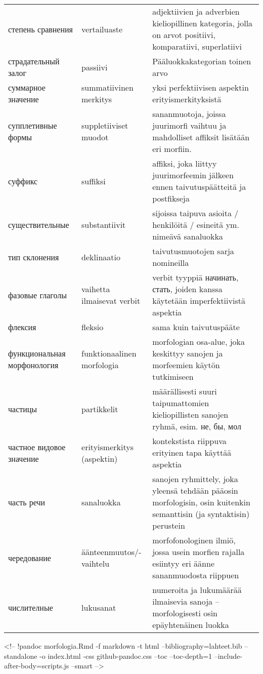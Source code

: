 \begin{longtable}[c]{@{}lll@{}}
степень сравнения & vertailuaste & adjektiivien ja adverbien
kieliopillinen kategoria, jolla on arvot positiivi, komparatiivi,
superlatiivi\tabularnewline
страдательный залог & passiivi & Pääluokkakategorian toinen
arvo\tabularnewline
суммарное значение & summatiivinen merkitys & yksi perfektiivisen
aspektin erityismerkityksistä\tabularnewline
супплетивные формы & suppletiiviset muodot & sananmuotoja, joissa
juurimorfi vaihtuu ja mahdolliset affiksit lisätään eri
morfiin.\tabularnewline
суффикс & suffiksi & affiksi, joka liittyy juurimorfeemin jälkeen ennen
taivutuspäätteitä ja postfikseja\tabularnewline
существительные & substantiivit & sijoissa taipuva asioita / henkilöitä
/ esineitä ym. nimeävä sanaluokka\tabularnewline
тип склонения & deklinaatio & taivutusmuotojen sarja
nomineilla\tabularnewline
фазовые глаголы & vaihetta ilmaisevat verbit & verbit tyyppiä начинать,
стать, joiden kanssa käytetään imperfektiivistä aspektia\tabularnewline
флексия & fleksio & sama kuin taivutuspääte\tabularnewline
функциональная морфонология & funktionaalinen morfologia & morfologian
osa-alue, joka keskittyy sanojen ja morfeemien käytön
tutkimiseen\tabularnewline
частицы & partikkelit & määrällisesti suuri taipumattomien
kieliopillisten sanojen ryhmä, esim. не, бы, мол\tabularnewline
частное видовое значение & erityismerkitys (aspektin) & kontekstista
riippuva erityinen tapa käyttää aspektia\tabularnewline
часть речи & sanaluokka & sanojen ryhmittely, joka yleensä tehdään
pääosin morfologisin, osin kuitenkin semanttisin (ja syntaktisin)
perustein\tabularnewline
чередование & äänteenmuutos/-vaihtelu & morfofonologinen ilmiö, jossa
usein morfien rajalla esiintyy eri äänne sananmuodosta
riippuen\tabularnewline
числителные & lukusanat & numeroita ja lukumäärää ilmaisevia sanoja --
morfologisesti osin epäyhtenäinen luokka\tabularnewline
\bottomrule
\end{longtable}

\textless{}!-- !pandoc morfologia.Rmd -f markdown -t html
--bibliography=lahteet.bib --standalone -o index.html -css
github-pandoc.css --toc --toc-depth=1 --include-after-body=scripts.js
--smart --\textgreater{}
